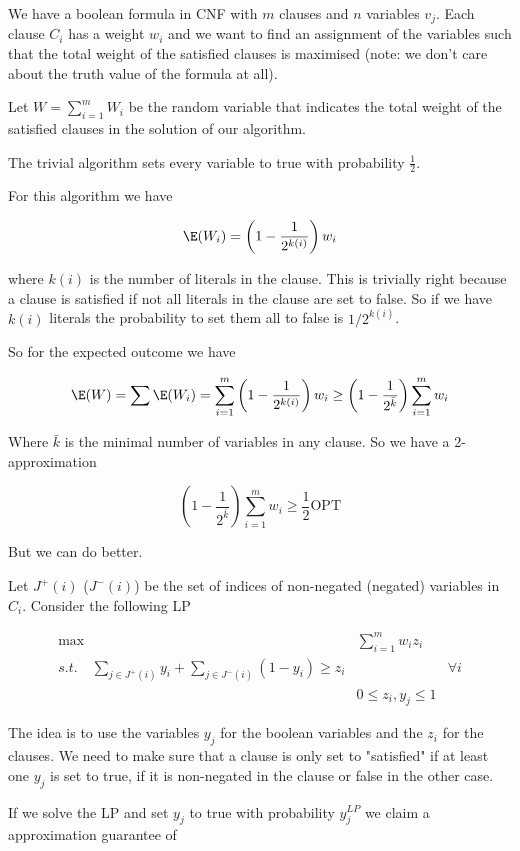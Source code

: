\begin{Ex} We have a boolean formula in CNF with $m$ clauses and $n$ variables $v_j$. Each clause $C_i$ has a weight $w_i$ and we want to find an assignment of the variables such that the total weight of the satisfied clauses is maximised (note: we don't care about the truth value of the formula at all).

Let $W= \sum_{i=1}^m W_i $ be the random variable that indicates the total weight of the satisfied clauses in the solution of our algorithm.

The trivial algorithm sets every variable to true with probability $\frac 12$.

For this algorithm we have

\[\E(W_i) = \left(1-\frac{1}{2^{k(i)}}\right)w_i\]

where $k(i)$ is the number of literals in the clause. This is trivially right because a clause is satisfied if not all literals in the clause are set to false. So if we have $k(i)$ literals the probability to set them all to false is $1/2^{k(i)}$.

So for the expected outcome we have

\[\E(W) = \sum \E(W_i) = \sum_{i=1}^m \left(1-\frac{1}{2^{k(i)}}\right) w_i \geq \left(1-\frac{1}{2^{\bar k}}\right) \sum_{i=1}^m w_i\]

Where $\bar k$ is the minimal number of variables in any clause. So we have a 2-approximation

\[\left(1-\frac{1}{2^{\bar k}}\right) \sum_{i=1}^m w_i \geq \frac 12 \text{OPT}\]

But we can do better. 

Let $J^+(i)$ ($J^-(i)$) be the set of indices of non-negated (negated) variables in $C_i$. Consider the following LP

\begin{align*}
\max \quad & \sum_{i=1}^m w_iz_i\\
s.t. \quad \sum_{j\in J^+(i)} y_i + \sum_{j\in J^-(i)} (1-y_i) \geq z_i && \forall i\\
&0\leq z_i, y_j \leq 1
\end{align*}

The idea is to use the variables $y_j$ for the boolean variables and the $z_i$ for the clauses. We need to make sure that a clause is only set to "satisfied" if at least one $y_j$ is set to true, if it is non-negated in the clause or false in the other case.

If we solve the LP and set $y_j$ to true with probability $y_j^{LP}$ we claim a approximation guarantee of 


\end{Ex}
